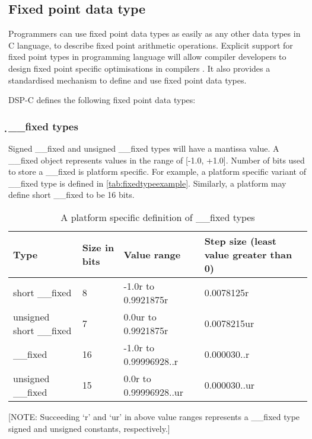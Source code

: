 \subsection{Fixed point data type}

Programmers can use fixed point data types as easily as any other data types in C language, to describe fixed point arithmetic operations. Explicit support for fixed point types in programming language will allow compiler developers to design fixed point specific optimisations in compilers \cite{dspcbenifits}. It also provides a standardised mechanism to define and use fixed point data types.

DSP-C defines the following fixed point data types:

\subsubsection{̣\_\_fixed types}
Signed \_\_fixed and unsigned \_\_fixed types will have a mantissa value. A \_\_fixed object represents values in the range of [-1.0, +1.0]. Number of bits used to store a \_\_fixed is platform specific. For example, a platform specific variant of \_\_fixed type is defined in \autoref{tab:fixedtypeexample}. Similarly, a platform may define short \_\_fixed to be 16 bits.

\begin{table}[htbp]
\centering
    \begin{tabular}{ | l | p{0.75cm} | l | p{2cm} |}
    \hline
    \textbf{Type}  & \textbf{Size in bits} & \textbf{Value range} & \textbf{Step size (least value greater than 0)} \\ \hline
    short \_\_fixed           & 8    & -1.0r to 0.9921875r  & 0.0078125r \\ \hline
    unsigned short \_\_fixed  & 7    & 0.0ur to 0.9921875r & 0.0078215ur\\ \hline
    \_\_fixed                 & 16   & -1.0r to 0.99996928..r & 0.000030..r\\ \hline
    unsigned \_\_fixed        & 15   & 0.0r to 0.99996928..ur & 0.000030..ur\\ \hline

    \end{tabular}
\caption{A platform specific definition of \_\_fixed types}
[NOTE: Succeeding `r' and `ur' in above value ranges represents a \_\_fixed type signed and unsigned constants, respectively.]
\label{tab:fixedtypeexample}
\end{table}


